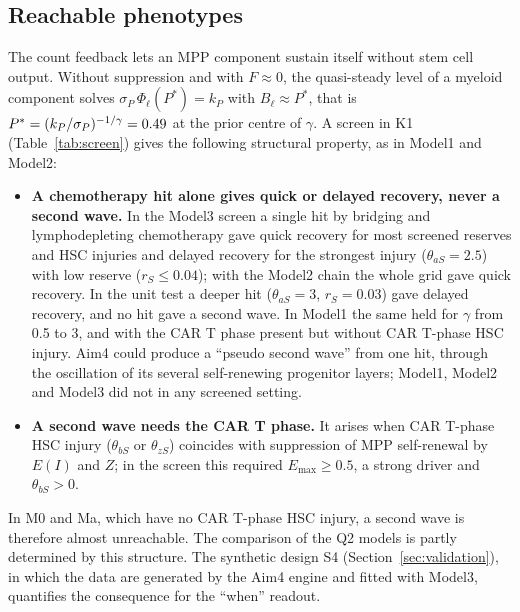 \documentclass[11pt]{article}
\begin{document}
\subsection{Reachable phenotypes}\label{sec:reachable}
The count feedback lets an MPP component sustain itself without stem cell output. Without suppression and with $F\approx0$, the quasi-steady level of a myeloid component solves $\sigma_P\,\Phi_\ell(P^\ast)=k_P$ with $B_\ell\approx P^\ast$, that is $P^\ast=(k_P/\sigma_P)^{-1/\gamma}=0.49$ at the prior centre of $\gamma$. A screen in K1 (Table~\ref{tab:screen}) gives the following structural property, as in Model1 and Model2:
\begin{itemize}
\item \textbf{A chemotherapy hit alone gives quick or delayed recovery, never a second wave.} In the Model3 screen a single hit by bridging and lymphodepleting chemotherapy gave quick recovery for most screened reserves and HSC injuries and delayed recovery for the strongest injury ($\theta_{aS}=2.5$) with low reserve ($r_S\leq0.04$); with the Model2 chain the whole grid gave quick recovery. In the unit test a deeper hit ($\theta_{aS}=3$, $r_S=0.03$) gave delayed recovery, and no hit gave a second wave. In Model1 the same held for $\gamma$ from 0.5 to 3, and with the CAR T phase present but without CAR T-phase HSC injury. Aim4 could produce a ``pseudo second wave'' from one hit, through the oscillation of its several self-renewing progenitor layers; Model1, Model2 and Model3 did not in any screened setting.
\item \textbf{A second wave needs the CAR T phase.} It arises when CAR T-phase HSC injury ($\theta_{bS}$ or $\theta_{zS}$) coincides with suppression of MPP self-renewal by $E(I)$ and $Z$; in the screen this required $E_{\max}\geq0.5$, a strong driver and $\theta_{bS}>0$.
\end{itemize}
In M0 and Ma, which have no CAR T-phase HSC injury, a second wave is therefore almost unreachable. The comparison of the Q2 models is partly determined by this structure. The synthetic design S4 (Section~\ref{sec:validation}), in which the data are generated by the Aim4 engine and fitted with Model3, quantifies the consequence for the ``when'' readout.



\end{document}

